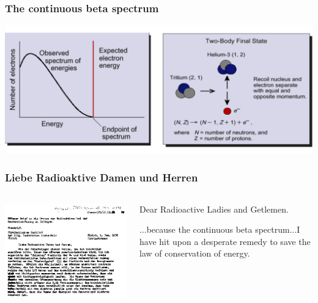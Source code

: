 

\begin{frame}
\frametitle{The continuous beta spectrum}
\includegraphics[scale=0.38]{img/beta-ray.png}
\end{frame}

\begin{frame}
\frametitle{Liebe Radioaktive Damen und Herren}
\begin{columns}
 
\includegraphics[scale=0.4]{img/liebe.png}
 
\begin{block}{}
Dear Radioactive Ladies and Getlemen.

...because the continuous beta spectrum...I have hit upon a desperate remedy to save the law of conservation of energy.

\end{block}
\end{columns}
\end{frame}

